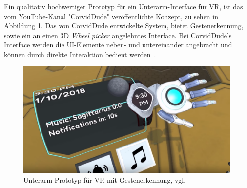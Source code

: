 \noindent Ein qualitativ hochwertiger Prototyp für ein Unterarm-Interface für VR, ist das vom YouTube-Kanal "CorvidDude" veröffentlichte Konzept, zu sehen in Abbildung \ref{fig:corviddude}. Das von CorvidDude entwickelte System, bietet Gestenerkennung, sowie ein an einen 3D \textit{Wheel picker} angelehntes Interface. Bei CorvidDude's Interface werden die UI-Elemente neben- und untereinander angebracht und können durch direkte Interaktion bedient werden~\citep{corviddude}.

\begin{figure}[h]
\captionsetup{width=.7\linewidth}
\includegraphics[scale=0.3]{Bilder/Hauptteil/arminterface}
\centering
\caption{Unterarm Prototyp für VR mit Gestenerkennung, vgl.~\citep{corviddude}}
\label{fig:corviddude}
\end{figure}

